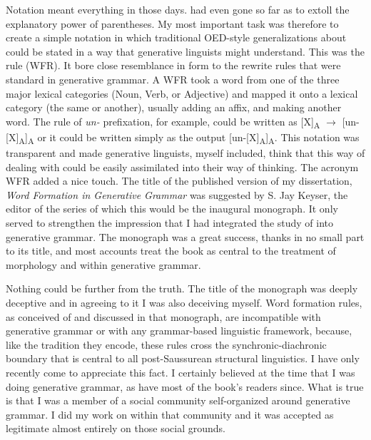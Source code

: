 \documentclass[output=paper]{langsci/langscibook}
\begin{document}
\newpage 
Notation meant everything in those days. %
\citet{Chomsky68} %
%
had
even gone so far as to extoll the explanatory power of parentheses. My
most important task was therefore to create a simple notation in which
traditional OED-style generalizations about  could be
stated in a way that generative linguists might understand. This was the
 rule (WFR). It bore close resemblance in form to the
rewrite rules that were standard in generative grammar. A WFR took a
word from one of the three major lexical categories (Noun, Verb, or
Adjective) and mapped it onto a lexical category (the same or another),
usually adding an affix, and making another word. The rule of \emph{un-}
prefixation, for example, could be written as {[}X{]}\textsubscript{A} $\rightarrow$
{[}un-{[}X{]}\textsubscript{A}{]}\textsubscript{A} or it could be
written simply as the output
{[}un-{[}X{]}\textsubscript{A}{]}\textsubscript{A}. This notation was
transparent and made generative linguists, myself included, think that
this way of dealing with  could be easily assimilated into
their way of thinking. The acronym WFR added a nice touch. The title of
the published version of my dissertation, \emph{Word Formation in
Generative Grammar} %
\citep{Aronoff1976} %
%
was suggested by S. Jay Keyser, the
editor of the series of which this would be the inaugural monograph. It
only served to strengthen the impression that I had integrated the study
of  into generative grammar. The monograph was a great
success, thanks in no small part to its title, and most accounts treat
the book as central to the treatment of morphology and 
within generative grammar.

Nothing could be further from the truth. The title of the monograph was
deeply deceptive and in agreeing to it I was also deceiving myself. Word
formation rules, as conceived of and discussed in that monograph, are
incompatible with generative grammar or with any grammar-based
linguistic framework, because, like the tradition they encode, these
rules cross the synchronic-diachronic boundary that is central to all
post-Saussurean structural linguistics. I have only recently come to
appreciate this fact. I certainly believed at the time that I was doing
generative grammar, as have most of the book's readers since. What is
true is that I was a member of a social community self-organized around
generative grammar. I did my work on  within that
community and it was accepted as legitimate almost entirely on those
social grounds.
\end{document}

